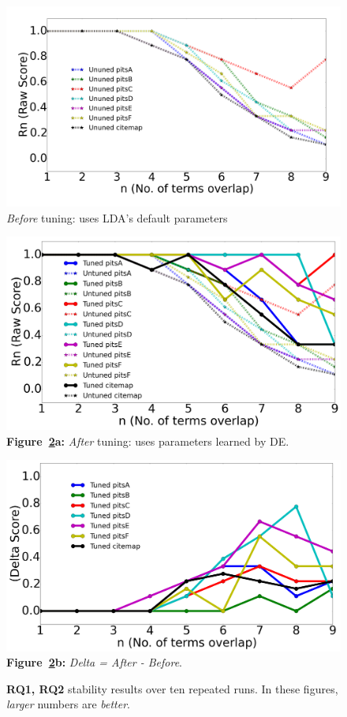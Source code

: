 \documentclass[twocolumn,5p,sort&compress]{elsarticle}
\theoremstyle{break}
\begin{document}
 
\begin{figure}[!b]
  \begin{center}
    \includegraphics[width=\linewidth]{./fig/Vem_untuned.png}
    \end{center}
  \caption{{\em Before} tuning: uses LDA's default parameters}\label{fig:delta11}  
\end{figure}
\begin{figure}[!b]
        \begin{center}
        \includegraphics[width=0.9\linewidth]{./fig/raw_graph.png}
  \footnotesize{{\bf Figure~\ref{fig:delta}a:}  {\em After} tuning: uses parameters learned by DE.}

        \includegraphics[width=0.9\linewidth]{./fig/tuned_delta_vem.png}
  \footnotesize{{\bf Figure~\ref{fig:delta}b:}  {\em Delta = After - Before}.}
  \end{center}
    \caption{{\bf RQ1, RQ2} stability results over ten repeated runs. In these figures, {\em larger} numbers
    are {\em better}.}\label{fig:delta}
\end{figure}
\end{document}
